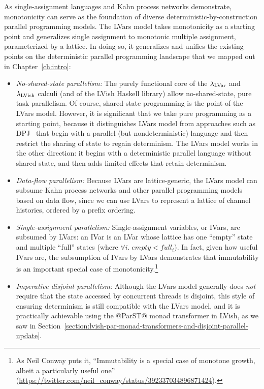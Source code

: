As single-assignment languages and Kahn process networks demonstrate,
monotonicity can serve as the foundation of diverse
deterministic-by-construction parallel programming models.  The LVars
model takes monotonicity as a starting point and generalizes single
assignment to monotonic multiple assignment, parameterized by a
lattice.  In doing so, it generalizes and unifies the existing points
on the deterministic parallel programming landscape that we mapped out
in Chapter~\ref{ch:intro}:
\begin{itemize}
  \item \emph{No-shared-state parallelism:} The purely functional core
    of the $\lambda_{\textrm{LVar}}$ and $\lambda_{\textrm{LVish}}$ calculi (and of the LVish
    Haskell library) allow no-shared-state, pure task parallelism.  Of
    course, shared-state programming is the point of the LVars model.
    However, it is significant that we take pure programming as a
    starting point, because it distinguishes LVars model from
    approaches such as DPJ~\cite{dpj-oopsla} that begin with a
    parallel (but nondeterministic) language and then restrict the
    sharing of state to regain determinism.  The LVars model works in
    the other direction: it begins with a deterministic parallel
    language without shared state, and then adds limited effects that
    retain determinism.
  \item \emph{Data-flow parallelism:} Because LVars are
    lattice-generic, the LVars model can subsume Kahn process networks
    and other parallel programming models based on data flow, since we
    can use LVars to represent a lattice of channel histories, ordered
    by a prefix ordering.
  \item \emph{Single-assignment parallelism:} Single-assignment
    variables, or IVars, are subsumed by LVars: an IVar is an LVar
    whose lattice has one ``empty'' state and multiple ``full'' states
    (where $\forall{i}.\; \mathit{empty} < \mathit{full_i}$).  In
    fact, given how useful IVars are, the subsumption of IVars by
    LVars demonstrates that immutability is an important special case
    of monotonicity.\footnote{As Neil Conway puts it, ``Immutability
      is a special case of monotone growth, albeit a particularly
      useful one''
      (\url{https://twitter.com/neil_conway/status/392337034896871424}).}
  \item \emph{Imperative disjoint parallelism:} Although the LVars
    model generally does \emph{not} require that the state accessed by
    concurrent threads is disjoint, this style of ensuring determinism
    is still compatible with the LVars model, and it is practically
    achievable using the @ParST@ monad transformer in LVish, as we saw
    in
    Section~\ref{section:lvish-par-monad-transformers-and-disjoint-parallel-update}.
\end{itemize}
